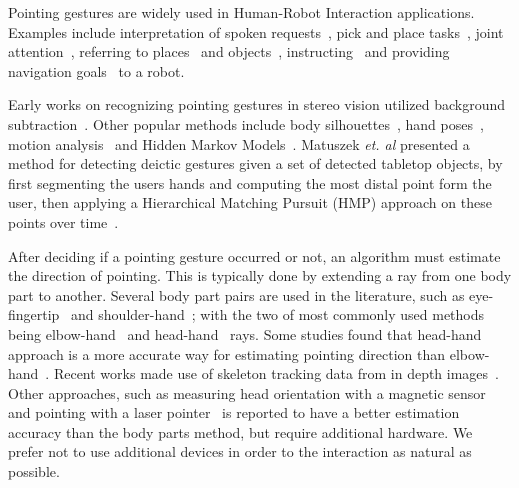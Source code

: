Pointing gestures are widely used in Human-Robot Interaction applications. Examples include interpretation of spoken requests~\cite{zukerman2010interpreting}, pick and place tasks~\cite{blodow2011inferring}, joint attention~\cite{droeschel2011towards}, referring to places~\cite{hato2010pointing} and objects~\cite{schmidt2008interacting}, instructing~\cite{martin2010estimation} and providing navigation goals~\cite{raza2013human} to a robot. 

Early works on recognizing pointing gestures in stereo vision utilized background subtraction~\cite{cipolla1996human,jojic2000detection,kahn1995understanding}. Other popular methods include body silhouettes~\cite{kehl2004real}, hand poses~\cite{hu2010hand}, motion analysis~\cite{matikainen2011prop} and Hidden Markov Models~\cite{wilson1999parametric, bennewitz2008robust, li2005hierarchical, nickel2003pointing, droeschel2011learning, aly2012integrated}. Matuszek \emph{et. al} presented a method for detecting deictic gestures given a set of detected tabletop objects, by first segmenting the users hands and computing the most distal point form the user, then applying a Hierarchical Matching Pursuit (HMP) approach on these points over time~\cite{matuszek2014learning}. 

After deciding if a pointing gesture occurred or not, an algorithm must estimate the direction of pointing. This is typically done by extending a ray from one body part to another. Several body part pairs are used in the literature, such as eye-fingertip~\cite{kehl2004real} and shoulder-hand~\cite{hosoya2004arm}; with the two of most commonly used methods being elbow-hand~\cite{raza2013human, brooks2006working, blodow2011inferring} and head-hand~\cite{bennewitz2008robust, schmidt2008interacting} rays. Some studies found that head-hand approach is a more accurate way for estimating pointing direction than elbow-hand~\cite{quintero2013sepo, droeschel2011towards}. Recent works made use of skeleton tracking data from in depth images~\cite{quintero2013sepo, blodow2011inferring, raza2013human}. Other approaches, such as measuring head orientation with a magnetic sensor~\cite{nickel2003pointing} and pointing with a laser pointer~\cite{cheng2009hand, kemp2008point} is reported to have a better estimation accuracy than the body parts method, but require additional hardware. We prefer not to use additional devices in order to the interaction as natural as possible.


